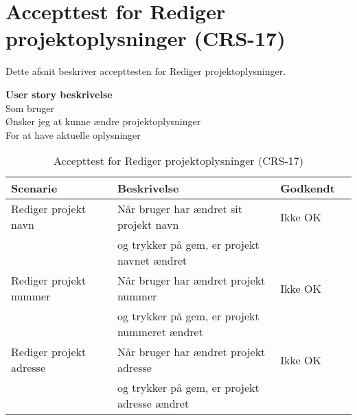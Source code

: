 \section{Accepttest for Rediger projektoplysninger (CRS-17)}
Dette afsnit beskriver accepttesten for Rediger projektoplysninger.

\textbf{User story beskrivelse} \\
Som bruger \\
Ønsker jeg at kunne ændre projektoplysninger \\
For at have aktuelle oplysninger

\begin{table}[H]
	\centering
	\begin{tabular}{|ll|l|ll|} \hline
		\textbf{Scenarie} &  & \textbf{Beskrivelse}&  \textbf{Godkendt}&  \\ \hline
		Rediger projekt navn&  &  Når bruger har ændret sit projekt navn &  Ikke OK&  \\
		& & og trykker på gem, er projekt navnet ændret& & \\ \hline
		Rediger projekt nummer&  &  Når bruger har ændret projekt nummer &  Ikke OK&  \\
		& & og trykker på gem, er projekt nummeret ændret & & \\ \hline
		Rediger projekt adresse&  &  Når bruger har ændret projekt adresse &  Ikke OK&  \\
		& & og trykker på gem, er projekt adresse ændret& & \\ \hline
	\end{tabular}
	\caption{Accepttest for Rediger projektoplysninger (CRS-17)}
	\label{AcceptRedigerProjekt}
\end{table}

\clearpage
